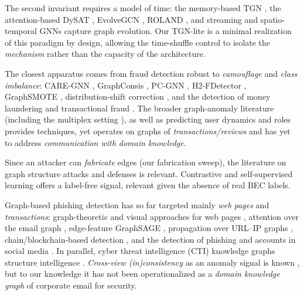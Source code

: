 The second invariant requires a model of time: the memory-based TGN
\citep{rossi2020temporal}, the attention-based DySAT \citep{sankar2020dysat}, EvolveGCN \citep{pareja2020evolvegcn},
ROLAND \citep{you2022roland}, and streaming and spatio-temporal GNNs
\citep{yu2023streaming,wang2022tsgn,nayebi2025spatiotemporal,behrouz2022anomaly} capture graph evolution. Our
TGN-lite is a minimal realization of this paradigm by design, allowing the time-shuffle control to isolate the
\emph{mechanism} rather than the capacity of the architecture.

The closest apparatus comes from fraud detection robust to
\emph{camouflage} and \emph{class imbalance}: CARE-GNN \citep{dou2020enhancing}, GraphConsis \citep{liu2020alleviating},
PC-GNN \citep{liu2021pick}, H2-FDetector \citep{shi2022h2fdetector}, GraphSMOTE \citep{zhao2021graphsmote},
distribution-shift correction \citep{gao2023alleviating,tang2022rethinking}, and the detection of money laundering
and transactional fraud \citep{weber2019antimoney,li2022ttagn,rayana2015collective}. The broader graph-anomaly
literature \citep{ding2019deep,park2020unsupervised,liu2021anomaly,ma2021comprehensive,zhang2021mcgc} (including the multiplex setting \citep{li2025umgad}), as well as predicting user dynamics and roles
\citep{kumar2019predicting,wu2020who,li2022pdgnn,mcauley2015image} provides techniques, yet operates on graphs of
\emph{transactions/reviews} and has yet to address \emph{communication with domain knowledge}.

Since an attacker can \emph{fabricate} edges
(our fabrication sweep), the literature on graph structure attacks
\citep{zugner2018adversarial,zugner2019adversarial,dai2022towards} and defenses
\citep{zhang2020gnnguard,jin2020graph,cai2021structural,wang2023label} is relevant. Contrastive and
self-supervised learning \citep{hassani2020contrastive,wang2021selfsupervised,singh2024node,yan2024topological}
offers a label-free signal, relevant given the absence of real BEC labels.

Graph-based phishing detection has so far
targeted mainly \emph{web pages} and \emph{transactions}: graph-theoretic and visual approaches for web pages
\citep{tan2020graph,lin2021phishpedia,abdelnabi2020visualphishnet}, attention over the email graph
\citep{safran2025phishinggnn}, edge-feature GraphSAGE \citep{lo2021egraphsage}, propagation over URL--IP graphs
\citep{guo2025efficient,li2022pdgnn}, chain/blockchain-based detection
\citep{daluwatta2022cgraph,edirimannage2022phishchain}, and the detection of phishing and accounts in social
media \citep{aggarwal2013phishari,shu2017user,koide2024chatspamdetector,song2025insight,dube2024building}. In
parallel, cyber threat intelligence (CTI) knowledge graphs structure intelligence
\citep{cheng2024ctinexus,fieblinger2024actionable,li2021siege}. \emph{Cross-view (in)consistency} as an anomaly
signal is known \citep{liu2020alleviating}, but to our knowledge it has not been operationalized as a \emph{domain
knowledge graph} of corporate email for security.

